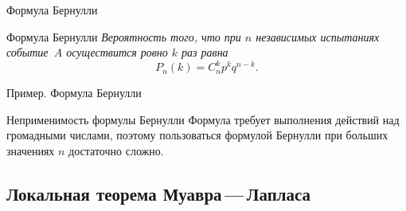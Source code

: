 \documentclass[unicode,11pt,notheorems,xcolor=table]{beamer}
\begin{document}
\begin{frame}{Формула Бернулли}{}
    \begin{block}{Формула Бернулли}
        \itshape
        Вероятность того, что при $n$ независимых испытаниях событие~$A$ осуществится ровно $k$ раз равна
        $$
            P_n(k)= C_n^k p^k q^{n-k}. 
        $$
    \end{block}
\end{frame}
    

\begin{frame}{Пример. Формула Бернулли}{}

\end{frame}

\begin{frame}{Неприменимость формулы Бернулли}{}
    Формула требует выполнения действий над громадными числами, поэтому пользоваться формулой Бернулли при больших значениях $n$ достаточно сложно.
\end{frame}
\subsection{Локальная теорема Муавра\,---\,Лапласа}
\end{document}
